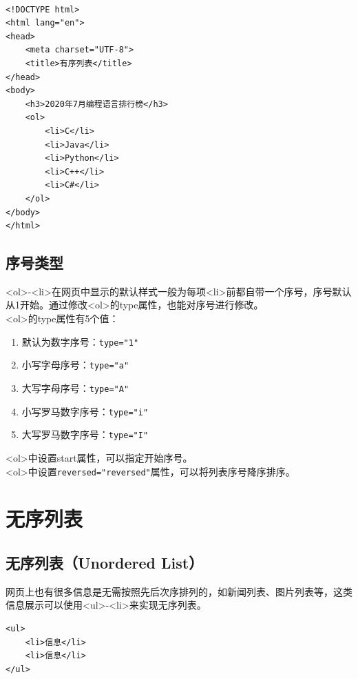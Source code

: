  \\

\begin{lstlisting}[style=htmlcssjs]
<!DOCTYPE html>
<html lang="en">
<head>
    <meta charset="UTF-8">
    <title>有序列表</title>
</head>
<body>
    <h3>2020年7月编程语言排行榜</h3>
    <ol>
        <li>C</li>
        <li>Java</li>
        <li>Python</li>
        <li>C++</li>
        <li>C#</li>
    </ol>
</body>
</html>
\end{lstlisting}

\subsection{序号类型}

<ol>-<li>在网页中显示的默认样式一般为每项<li>前都自带一个序号，序号默认从1开始。通过修改<ol>的type属性，也能对序号进行修改。 \\

<ol>的type属性有5个值：

\begin{enumerate}
	\item 默认为数字序号：\lstinline|type="1"|
	\item 小写字母序号：\lstinline|type="a"|
	\item 大写字母序号：\lstinline|type="A"|
	\item 小写罗马数字序号：\lstinline|type="i"|
	\item 大写罗马数字序号：\lstinline|type="I"|
\end{enumerate}

<ol>中设置start属性，可以指定开始序号。 \\

<ol>中设置\lstinline|reversed="reversed"|属性，可以将列表序号降序排序。

\newpage

\section{无序列表}

\subsection{无序列表（Unordered List）}

网页上也有很多信息是无需按照先后次序排列的，如新闻列表、图片列表等，这类信息展示可以使用<ul>-<li>来实现无序列表。

\begin{lstlisting}[style=htmlcssjs]
<ul>
    <li>信息</li>
    <li>信息</li>
</ul>
\end{lstlisting}

